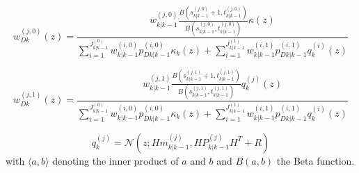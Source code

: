 \documentclass{article}
\newcommand{\clut}{{(0)}}
\newcommand{\tgt}{{(1)}}
\newcommand{\clutj}{{(j,0)}}
\newcommand{\tgtj}{{(j,1)}}
\newcommand{\cluti}{{(i,0)}}
\newcommand{\tgti}{{(i,1)}}
\begin{document}
\begin{equation}
  \label{eq:lpdwD0}
  w_{Dk}^\clutj(z) = \frac{w_{k|k-1}^\clutj  \frac{B\left( s_{k|k-1}^\clutj+1,t_{k|k-1}^\clutj\right)}{B\left( s_{k|k-1}^\clutj,t_{k|k-1}^\clutj\right)}\kappa(z)}
  {\sum_{i=1}^{J_{k|k-1}^\clut}w_{k|k-1}^\cluti p_{Dk|k-1}^\cluti\kappa_k(z) +  \sum_{i=1}^{J_{k|k-1}^\tgt}w_{k|k-1}^\tgti p_{Dk|k-1}^\tgti q_k^{(i)}(z)  }
\end{equation}

\begin{equation}
  \label{eq:lpdwD1}
  w_{Dk}^\tgtj(z) = \frac{w_{k|k-1}^\tgtj  \frac{B\left( s_{k|k-1}^\tgtj+1,t_{k|k-1}^\tgtj\right)}{B\left( s_{k|k-1}^\tgtj,t_{k|k-1}^\tgtj\right)}q_k^{(j)}(z)}
  {\sum_{i=1}^{J_{k|k-1}^\clut}w_{k|k-1}^\cluti p_{Dk|k-1}^\cluti\kappa_k(z) +  \sum_{i=1}^{J_{k|k-1}^\tgt}w_{k|k-1}^\tgti p_{Dk|k-1}^\tgti q_k^{(i)}(z)  }
\end{equation}

\begin{equation}
  \label{eq:qz}
  q_k^{(j)} = \mathcal{N}(z;Hm_{k|k-1}^{(j)}, HP_{k|k-1}^{(j)}H^T + R)
\end{equation}
with $\langle a, b \rangle$ denoting the inner product of $a$ and $b$ and $B(a, b)$ the Beta function.
\end{document}
